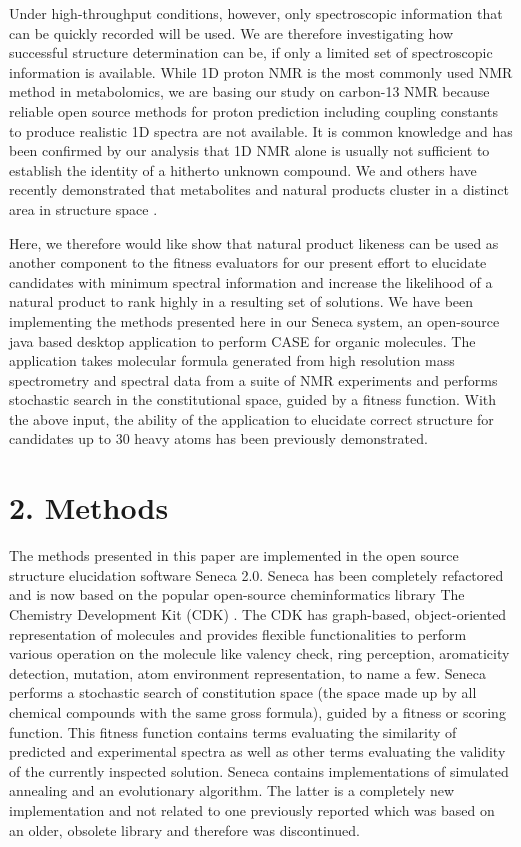 \documentclass[10pt]{bmc_article}
\newenvironment{bmcformat}{\begin{raggedright}\baselineskip20pt\sloppy\setboolean{publ}{false}}{\end{raggedright}\baselineskip20pt\sloppy}
\begin{document}
\begin{bmcformat}
Under high-throughput conditions, however, only spectroscopic information that can be quickly recorded will be used. We are therefore investigating how successful structure determination can be, if only a limited set of spectroscopic information is available. While 1D proton NMR is the most commonly used NMR method in metabolomics, we are basing our study on carbon-13 NMR because reliable open source methods for proton prediction including coupling constants to produce realistic 1D spectra are not available. It is common knowledge and has been confirmed by our analysis that 1D NMR alone is usually not sufficient to establish the identity of a hitherto unknown compound.  We and others have recently demonstrated that metabolites and natural products cluster in a distinct area in structure space \cite{Peironcely:2011fm, Jayaseelan}. 

Here, we therefore would like show that natural product likeness can be used as another component to the fitness evaluators for our present effort to elucidate candidates with minimum spectral information and increase the likelihood of a natural product to rank highly in a resulting set of solutions. 
We have been implementing the methods presented here in our Seneca system, an open-source java based desktop application to perform CASE for organic molecules. The application takes molecular formula generated from high resolution mass spectrometry and spectral data from a suite of NMR experiments and performs stochastic search in the constitutional space, guided by a fitness function. With the above input, the ability of the application to elucidate correct structure for candidates up to 30 heavy atoms has been previously demonstrated. 

\section*{2. Methods}

The methods presented in this paper are implemented in the open source structure elucidation software Seneca 2.0. 
Seneca has been completely refactored  and is now based on the popular open-source cheminformatics library The Chemistry Development Kit (CDK) \cite{Luttmann,Guha}.   The CDK has graph-based, object-oriented representation of molecules and provides flexible functionalities to perform various operation on the molecule like valency check, ring perception, aromaticity detection, mutation, atom environment representation, to name a few. 
Seneca performs a stochastic search of constitution space (the space made up by all chemical compounds with the same gross formula), guided by a fitness or scoring function. This fitness function contains terms evaluating the similarity of predicted and experimental spectra as well as other terms evaluating the validity of the currently inspected solution. 
Seneca contains implementations of simulated annealing \cite{Steinbeck} and an evolutionary algorithm. The latter is a completely new implementation and not related to one previously reported \cite{Han} which was based on an older, obsolete library and therefore was discontinued.       
     

\end{bmcformat}
\end{document}
